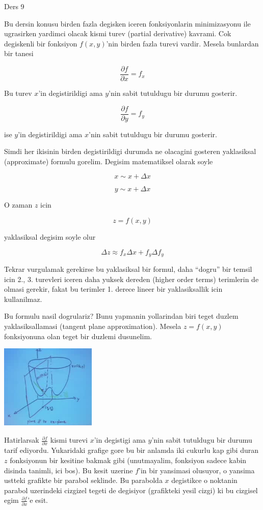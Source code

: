\documentclass[12pt,fleqn]{article}\usepackage{../common}
\begin{document}
Ders 9

Bu dersin konusu birden fazla degisken iceren fonksiyonlarin minimizasyonu
ile ugrasirken yardimci olacak kismi turev (partial derivative)
kavrami. Cok degiskenli bir fonksiyon $f(x,y)$'nin birden fazla turevi
vardir. Mesela bunlardan bir tanesi

\[ \frac{\partial f}{\partial x} = f_x \]

Bu turev $x$'in degistirildigi ama $y$'nin sabit tutuldugu bir durumu
gosterir. 

\[ \frac{\partial f}{\partial y} = f_y \]

ise $y$'in degistirildigi ama $x$'nin sabit tutuldugu bir durumu gosterir.

Simdi her ikisinin birden degistirildigi durumda ne olacagini gosteren
yaklasiksal (approximate) formulu gorelim. Degisim matematiksel olarak
soyle

\[ x \sim x + \Delta x \]

\[ y \sim x + \Delta x \]

O zaman $z$ icin

\[ z = f(x,y) \]

yaklasiksal degisim soyle olur

\begin{equation}\label{eq1}
\Delta z \approx f_x\Delta x + f_y \Delta f_y
\end{equation}


Tekrar vurgulamak gerekirse bu yaklasiksal bir formul, daha ``dogru'' bir
temsil icin 2., 3. turevleri iceren daha yuksek dereden (higher order
terms) terimlerin de olmasi gerekir, fakat bu terimler 1. derece lineer bir
yaklasiksallik icin kullanilmaz. 

Bu formulu nasil dogrulariz? Bunu yapmanin yollarindan biri teget duzlem
yaklasiksallamasi (tangent plane approximation). Mesela $z = f(x,y)$
fonksiyonuna olan teget bir duzlemi dusunelim.

\includegraphics[height=4cm]{9_1.png}

Hatirlarsak $\frac{\partial f}{\partial x}$ kismi turevi $x$'in degistigi
ama $y$'nin sabit tutuldugu bir durumu tarif ediyordu. Yukaridaki grafige
gore bu bir anlamda iki cukurlu kap gibi duran $z$ fonksiyonun bir kesitine
bakmak gibi (unutmayalim, fonksiyon sadece kabin disinda tanimli, ici
bos). Bu kesit uzerine $f$'in bir yansimasi olusuyor, o yansima ustteki
grafikte bir parabol seklinde. Bu parabolda $x$ degistikce o noktanin
parabol uzerindeki cizgizel tegeti de degisiyor (grafikteki yesil cizgi) ki
bu cizgisel egim $\frac{\partial f}{\partial x}$'e esit.
\end{document}
